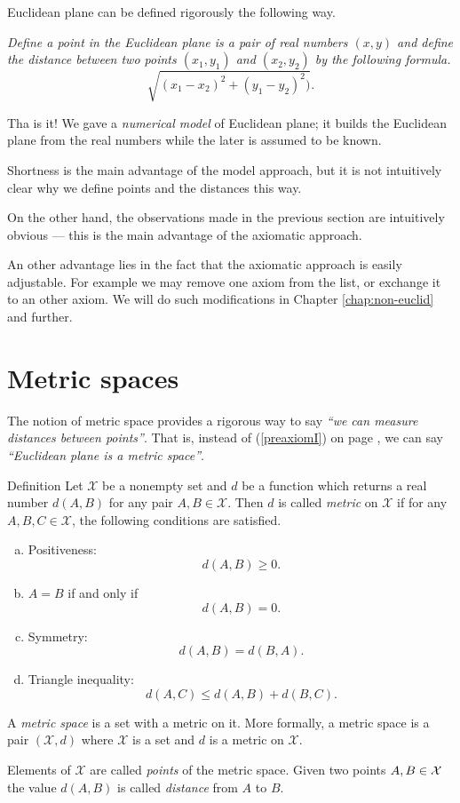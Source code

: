 Euclidean plane can be defined rigorously the following way.

{}\emph{Define a {}\emph{point} in the Euclidean plane is a pair of real numbers $(x,y)$ and define the {}\emph{distance} between two points $(x_1,y_1)$ and $(x_2,y_2)$ by the following formula.}
\[\sqrt{(x_1-x_2)^2+(y_1-y_2)^2)}.\]

Tha is it!
We gave a {}\emph{numerical model} of Euclidean plane;
it builds the Euclidean plane from the real numbers
while the later is assumed to be known.

Shortness is the main advantage of the model approach,
but it is not intuitively clear why we define points and the distances this way.

On the other hand, the observations made in the previous section are  intuitively obvious ---
this is the main advantage of the axiomatic approach.

An other advantage lies in the fact that the axiomatic approach is easily adjustable. 
For example we may remove one axiom from the list,
or exchange it to an other axiom. 
We will do such modifications in Chapter \ref{chap:non-euclid} and further.

\section*{Metric spaces}

The notion of metric space provides 
a rigorous way to say {}\emph{``we can measure distances between points''}.
That is, instead of (\ref{preaxiomI}) on page \pageref{preaxiomI},
we can say {}\emph{``Euclidean plane is a metric space''}.

\begin{thm}{Definition}\label{def:metric-space}
Let $\mathcal X$ be a nonempty set and 
$d$ be a function
which returns a real number $d(A,B)$
for any pair $A,B\in\mathcal X$.
Then $d$
is called \emph{metric} on 
$\mathcal X$ if for any
$A,B,C\in \mathcal X$, the following conditions are satisfied.
\begin{enumerate}[(a)]
\item\label{def:metric-space:a} Positiveness: 
$$d(A,B)\ge 0.$$
\item\label{def:metric-space:b}  $A=B$ if and only if 
$$d(A,B)=0.$$
\item\label{def:metric-space:c} Symmetry: $$d(A, B) = d(B, A).$$
\item\label{def:metric-space:d} Triangle inequality: 
$$d(A, C) \le d(A, B) + d(B, C).$$
\end{enumerate}
A \emph{metric space} is a set with a metric on it. 
More formally, a metric space is a pair $(\mathcal X, d)$ where $\mathcal X$ is a set and $d$ is a metric on $\mathcal X$.

Elements of $\mathcal X$ are called \emph{points} of the metric space.
Given two points $A,B\z\in \mathcal X$ the value
$d(A, B)$ is called \emph{distance} from $A$ to $B$.
\end{thm}

